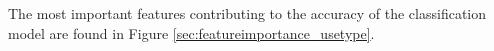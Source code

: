 The most important features contributing to the accuracy of the classification model are found in Figure \ref{sec:featureimportance_usetype}.